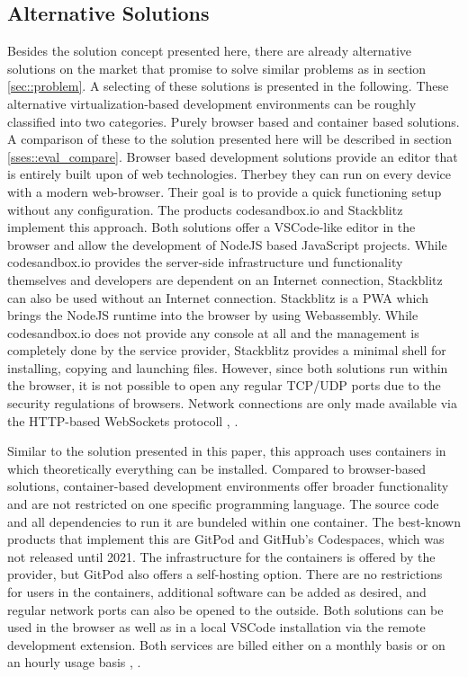 \subsection{Alternative Solutions}\label{ssec::alternatives}
Besides the solution concept presented here, there are already alternative solutions on the market that promise to solve similar problems as in section \ref{sec::problem}. A selecting of these solutions is presented in the following. These alternative virtualization-based development environments can be roughly classified into two categories. Purely browser based and container based solutions. A comparison of these to the solution presented here will be described in section \ref{sses::eval_compare}.
Browser based development solutions provide an editor that is entirely built upon of web technologies. Therbey they can run on every device with a modern web-browser. Their goal is to provide a quick functioning setup without any configuration.\newline
The products codesandbox.io and Stackblitz implement this approach. Both solutions offer a \ac{VSCode}-like editor in the browser and allow the development of NodeJS based JavaScript projects.
While codesandbox.io provides the server-side infrastructure und functionality themselves and developers are dependent on an Internet connection, Stackblitz can also be used without an Internet connection. Stackblitz is a \ac{PWA} which brings the NodeJS runtime into the browser by using Webassembly. While codesandbox.io does not provide any console at all and the management is completely done by the service provider, Stackblitz provides a minimal shell for installing, copying and launching files. However, since both solutions run within the browser, it is not possible to open any regular TCP/UDP ports due to the security regulations of browsers. Network connections are only made available via the HTTP-based WebSockets protocoll \cite{codesandbox}, \cite{stackblitz}.

Similar to the solution presented in this paper, this approach uses containers in which theoretically everything can be installed. Compared to browser-based solutions, container-based development environments offer broader functionality and are not restricted on one specific programming language. The source code and all dependencies to run it are bundeled within one container. The best-known products that implement this are GitPod and GitHub's Codespaces, which was not released until 2021. The infrastructure for the containers is offered by the provider, but GitPod also offers a self-hosting option. There are no restrictions for users in the containers, additional software can be added as desired, and regular network ports can also be opened to the outside. Both solutions can be used in the browser as well as in a local \ac{VSCode} installation via the remote development extension.\newline
Both services are billed either on a monthly basis or on an hourly usage basis \cite{githubcodespace}, \cite{gitpod}.
